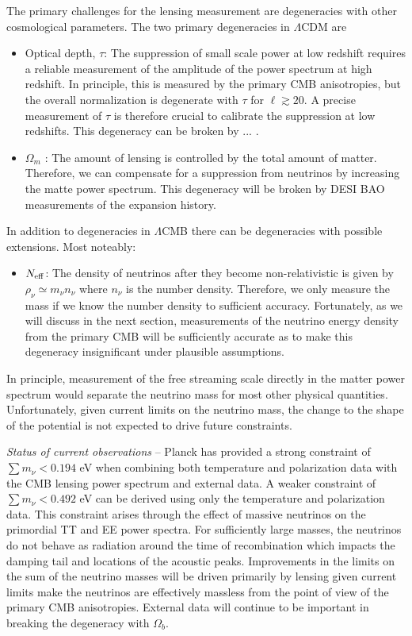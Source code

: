 The primary challenges for the lensing measurement are degeneracies with other cosmological parameters.  The two primary degeneracies in $\Lambda$CDM are
\begin{itemize}
\item Optical depth, $\tau$: The suppression of small scale power at low redshift requires a reliable measurement of the amplitude of the power spectrum at high redshift.  In principle, this is measured by the primary CMB anisotropies, but the overall normalization is degenerate with $\tau$ for $\ell \gtrsim 20$.  A precise measurement of $\tau$ is therefore crucial to calibrate the suppression at low redshifts.  This degeneracy can be broken by ... .
\item $\Omega_m$ : The amount of lensing is controlled by the total amount of matter.  Therefore, we can compensate for a suppression from neutrinos by increasing the matte power spectrum.  This degeneracy will be broken by DESI BAO measurements of the expansion history.
\end{itemize}
In addition to degeneracies in $\Lambda$CMB there can be degeneracies with possible extensions.  Most noteably:
\begin{itemize}
\item $N_{\rm eff}$: The density of neutrinos after they become non-relativistic is given by $\rho_\nu \simeq m_\nu n_\nu$ where $n_\nu$ is the number density.  Therefore, we only measure the mass if we know the number density to sufficient accuracy.  Fortunately, as we will discuss in the next section, measurements of the neutrino energy density from the primary CMB will be sufficiently accurate as to make this degeneracy insignificant under plausible assumptions.
\end{itemize}
In principle, measurement of the free streaming scale directly in the matter power spectrum would separate the neutrino mass for most other physical quantities.  Unfortunately, given current limits on the neutrino mass, the change to the shape of the potential is not expected to drive future constraints.  

{\it Status of current observations} -- Planck has provided a strong constraint of $\sum m_\nu < 0.194$ eV when combining both temperature and polarization data with the CMB lensing power spectrum and external data.  A weaker constraint of $\sum m_\nu < 0.492$ eV can be derived using only the temperature and polarization data.  This constraint arises through the effect of massive neutrinos on the primordial TT and EE power spectra.  For sufficiently large masses, the neutrinos do not behave as radiation around the time of recombination which impacts the damping tail and locations of the acoustic peaks.  Improvements in the limits on the sum of the neutrino masses will be driven primarily by lensing given current limits make the neutrinos are effectively massless from the point of view of the primary CMB anisotropies.  External data will continue to be important in breaking the degeneracy with $\Omega_b$.  

